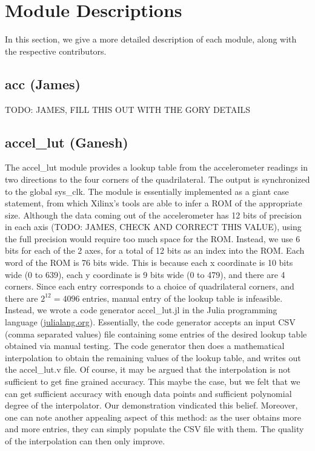 \documentclass{article}
\begin{document}
\section{Module Descriptions}

In this section, we give a more detailed description of each module, along with the respective contributors.

\subsection{acc (James)}
TODO: JAMES, FILL THIS OUT WITH THE GORY DETAILS

\subsection{accel\_lut (Ganesh)}
The accel\_lut module provides a lookup table from the accelerometer readings in two directions to the four corners of the quadrilateral.
The output is synchronized to the global sys\_clk.
The module is essentially implemented as a giant case statement, from which Xilinx's tools are able to infer a ROM of the appropriate size.
Although the data coming out of the accelerometer has 12 bits of precision in each axis (TODO: JAMES, CHECK AND CORRECT THIS VALUE),
using the full precision would require too much space for the ROM.
Instead, we use 6 bits for each of the 2 axes, for a total of 12 bits as an index into the ROM.
Each word of the ROM is 76 bits wide.
This is because each x coordinate is 10 bits wide (0 to 639), each y coordinate is 9 bits wide (0 to 479), and there are 4 corners.
Since each entry corresponds to a choice of quadrilateral corners, and there are $2^{12} = 4096$ entries, manual entry of the lookup table is infeasible.
Instead, we wrote a code generator accel\_lut.jl in the Julia programming language (\url{julialang.org}).
Essentially, the code generator accepts an input CSV (comma separated values) file containing some entries of the desired lookup table obtained via manual testing.
The code generator then does a mathematical interpolation to obtain the remaining values of the lookup table, and writes out the accel\_lut.v file.
Of course, it may be argued that the interpolation is not sufficient to get fine grained accuracy.
This maybe the case, but we felt that we can get sufficient accuracy with enough data points and sufficient polynomial degree of the interpolator.
Our demonstration vindicated this belief.
Moreover, one can note another appealing aspect of this method: as the user obtains more and more entries, they can simply populate the CSV file with them.
The quality of the interpolation can then only improve.
\end{document}
